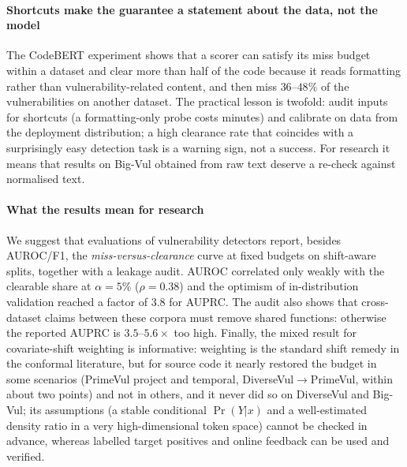 \paragraph{Shortcuts make the guarantee a statement about the data, not the model} The CodeBERT experiment shows that a scorer can satisfy its miss budget within a dataset and clear more than half of the code because it reads formatting rather than vulnerability-related content, and then miss $36$--$48\%$ of the vulnerabilities on another dataset. The practical lesson is twofold: audit inputs for shortcuts (a formatting-only probe costs minutes) and calibrate on data from the deployment distribution; a high clearance rate that coincides with a surprisingly easy detection task is a warning sign, not a success. For research it means that results on Big-Vul obtained from raw text deserve a re-check against normalised text.

\paragraph{What the results mean for research}
We suggest that evaluations of vulnerability detectors report, besides AUROC/F1, the \emph{miss-versus-clearance} curve at fixed budgets on shift-aware splits, together with a leakage audit. AUROC correlated only weakly with the clearable share at $\alpha=5\%$ ($\rho=0.38$) and the optimism of in-distribution validation reached a factor of 3.8 for AUPRC. The audit also shows that cross-dataset claims between these corpora must remove shared functions: otherwise the reported AUPRC is $3.5$--$5.6\times$ too high. Finally, the mixed result for covariate-shift weighting is informative: weighting is the standard shift remedy in the conformal literature, but for source code it nearly restored the budget in some scenarios (PrimeVul project and temporal, DiverseVul$\to$PrimeVul, within about two points) and not in others, and it never did so on DiverseVul and Big-Vul; its assumptions (a stable conditional $\Pr(Y|x)$ and a well-estimated density ratio in a very high-dimensional token space) cannot be checked in advance, whereas labelled target positives and online feedback can be used and verified.

